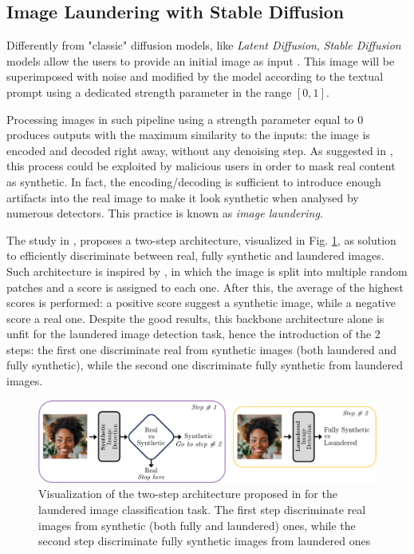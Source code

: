 \documentclass[conference]{IEEEtran} %
\begin{document}
    \subsection{Image Laundering with Stable Diffusion}
        \label{sec:laundering}
        Differently from "classic" diffusion models, like \textit{Latent Diffusion}, \textit{Stable Diffusion} models allow the users to provide an initial image as input \cite{sd1_github} \cite{sd2_github} \cite{podell2023sdxl} \cite{sauer2023adversarial-sdxl-turbo}. This image will be superimposed with noise and modified by the model according to the textual prompt using a dedicated strength parameter in the range $[0, 1]$.

        Processing images in such pipeline using a strength parameter equal to 0 produces outputs with the maximum similarity to the inputs: the image is encoded and decoded right away, without any denoising step. As suggested in \cite{mandelli2024synthetic}, this process could be exploited by malicious users in order to mask real content as synthetic. In fact, the encoding/decoding is sufficient to introduce enough artifacts into the real image to make it look synthetic when analysed by numerous detectors. This practice is known as \textit{image laundering}.

        The study in \cite{mandelli2024synthetic}, proposes a two-step architecture, visualized in Fig. \ref{fig:launder_2_stage}, as solution to efficiently discriminate between real, fully synthetic and laundered images. Such architecture is inspired by \cite{mandelli2022detecting}, in which the image is split into multiple random patches and a score is assigned to each one. After this, the average of the highest scores is performed: a positive score suggest a synthetic image, while a negative score a real one. Despite the good results, this backbone architecture alone is unfit for the laundered image detection task, hence the introduction of the 2 steps: the first one discriminate real from synthetic images (both laundered and fully synthetic), while the second one discriminate fully synthetic from laundered images.

        \begin{figure}[h]
            \centering
            \includegraphics[width=0.95\linewidth]{Img/launder_2_stage.png}
            \caption{Visualization of the two-step architecture proposed in \cite{mandelli2024synthetic} for the laundered image classification task. The first step discriminate real images from synthetic (both fully and laundered) ones, while the second step discriminate fully synthetic images from laundered ones}
            \label{fig:launder_2_stage}
        \end{figure}
\end{document}
